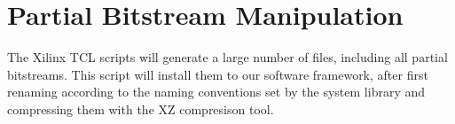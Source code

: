 

\section{Partial Bitstream Manipulation}
\label{sec:scripts-install}

The Xilinx TCL scripts will generate a large number of files, 
including all partial bitstreams. This script will install them to our software framework,
after first renaming according to the naming conventions set by the system library
and compressing them with the XZ compresison tool.



